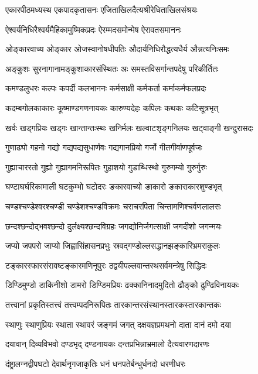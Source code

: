 \twolineshloka
{एकारपीठमध्यस्थ एकपादकृतासनः}
{एजिताखिलदैत्यश्रीरेधिताखिलसंश्रयः}%

\twolineshloka
{ऐश्वर्यनिधिरैश्वर्यमैहिकामुष्मिकप्रदः}
{ऐरम्मदसमोन्मेष ऐरावतसमाननः}%

\twolineshloka
{ओङ्कारवाच्य ओङ्कार ओजस्वानोषधीपतिः}
{औदार्यनिधिरौद्धत्यधैर्य औन्नत्यनिःसमः}%

\twolineshloka
{अङ्कुशः सुरनागानामङ्कुशाकारसंस्थितः}
{अः समस्तविसर्गान्तपदेषु परिकीर्तितः}%

\twolineshloka
{कमण्डलुधरः कल्पः कपर्दी कलभाननः}
{कर्मसाक्षी कर्मकर्ता कर्माकर्मफलप्रदः}%

\twolineshloka
{कदम्बगोलकाकारः कूष्माण्डगणनायकः}
{कारुण्यदेहः कपिलः कथकः कटिसूत्रभृत्}%

\twolineshloka
{खर्वः खड्गप्रियः खड्गः खान्तान्तःस्थः खनिर्मलः}
{खल्वाटशृङ्गनिलयः खट्वाङ्गी खन्दुरासदः}%

\twolineshloka
{गुणाढ्यो गहनो गद्यो गद्यपद्यसुधार्णवः}
{गद्यगानप्रियो गर्जो गीतगीर्वाणपूर्वजः}%

\twolineshloka
{गुह्याचाररतो गुह्यो गुह्यागमनिरूपितः}
{गुहाशयो गुडाब्धिस्थो गुरुगम्यो गुरुर्गुरुः}%

\twolineshloka
{घण्टाघर्घरिकामाली घटकुम्भो घटोदरः}
{ङकारवाच्यो ङाकारो ङकाराकारशुण्डभृत्}%

\twolineshloka
{चण्डश्चण्डेश्वरश्चण्डी चण्डेशश्चण्डविक्रमः}
{चराचरपिता चिन्तामणिश्चर्वणलालसः}%

\twolineshloka
{छन्दश्छन्दोद्भवश्छन्दो दुर्लक्ष्यश्छन्दविग्रहः}
{जगद्योनिर्जगत्साक्षी जगदीशो जगन्मयः}%

\twolineshloka
{जप्यो जपपरो जाप्यो जिह्वासिंहासनप्रभुः}
{स्रवद्गण्डोल्लसद्धानझङ्कारिभ्रमराकुलः}%

\twolineshloka
{टङ्कारस्फारसंरावष्टङ्कारमणिनूपुरः}
{ठद्वयीपल्लवान्तस्थसर्वमन्त्रेषु सिद्धिदः}%

\twolineshloka
{डिण्डिमुण्डो डाकिनीशो डामरो डिण्डिमप्रियः}
{ढक्कानिनादमुदितो ढौङ्को ढुण्ढिविनायकः}%

\twolineshloka
{तत्त्वानां प्रकृतिस्तत्त्वं तत्त्वम्पदनिरूपितः}
{तारकान्तरसंस्थानस्तारकस्तारकान्तकः}%

\twolineshloka
{स्थाणुः स्थाणुप्रियः स्थाता स्थावरं जङ्गमं जगत्}
{दक्षयज्ञप्रमथनो दाता दानं दमो दया}%

\twolineshloka
{दयावान् दिव्यविभवो दण्डभृद् दण्डनायकः}
{दन्तप्रभिन्नाभ्रमालो दैत्यवारणदारणः}%

\twolineshloka
{दंष्ट्रालग्नद्वीपघटो देवार्थनृगजाकृतिः}
{धनं धनपतेर्बन्धुर्धनदो धरणीधरः}%

